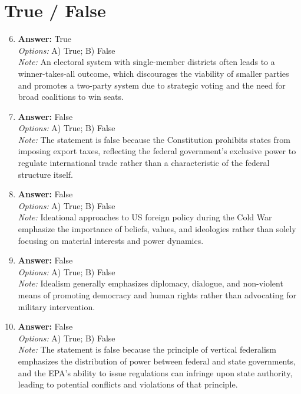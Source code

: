\documentclass[12pt]{article}
\begin{document}
\section*{True / False}
\begin{enumerate}[label=\arabic*.]
\setcounter{enumi}{5}
\item \textbf{Answer:} True
\\ \textit{Options:} A) True; B) False
\\ \textit{Note:} An electoral system with single-member districts often leads to a winner-takes-all outcome, which discourages the viability of smaller parties and promotes a two-party system due to strategic voting and the need for broad coalitions to win seats.
\item \textbf{Answer:} False
\\ \textit{Options:} A) True; B) False
\\ \textit{Note:} The statement is false because the Constitution prohibits states from imposing export taxes, reflecting the federal government's exclusive power to regulate international trade rather than a characteristic of the federal structure itself.
\item \textbf{Answer:} False
\\ \textit{Options:} A) True; B) False
\\ \textit{Note:} Ideational approaches to US foreign policy during the Cold War emphasize the importance of beliefs, values, and ideologies rather than solely focusing on material interests and power dynamics.
\item \textbf{Answer:} False
\\ \textit{Options:} A) True; B) False
\\ \textit{Note:} Idealism generally emphasizes diplomacy, dialogue, and non-violent means of promoting democracy and human rights rather than advocating for military intervention.
\item \textbf{Answer:} False
\\ \textit{Options:} A) True; B) False
\\ \textit{Note:} The statement is false because the principle of vertical federalism emphasizes the distribution of power between federal and state governments, and the EPA's ability to issue regulations can infringe upon state authority, leading to potential conflicts and violations of that principle.
\end{enumerate}
\end{document}
